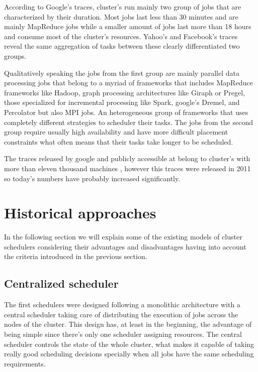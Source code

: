 \documentclass{report}                     %
\begin{document}
According to Google's traces, cluster's run mainly two group of jobs that
are characterized by their duration. Most jobs last less than 30 minutes
and are mainly MapReduce jobs while a smaller amount of jobs last
more than 18 hours and consume most of the cluster's resources. Yahoo's
and Facebook's traces reveal the same aggregation of tasks between these
clearly differentiated two groups.

Qualitatively speaking the jobs from the first group are mainly parallel
data processing jobs that belong to a myriad of frameworks that includes
MapReduce frameworks like Hadoop, graph processing architectures like
Giraph or Pregel, those specialized for incremental processing like Spark, 
google's Dremel, and Percolator but also MPI jobs. An heterogeneous group
of frameworks that uses completely different strategies to scheduler their
tasks. The jobs from the second group require usually high availability and
have more difficult placement constraints what often means that their tasks
take longer to be scheduled.

The traces released by google and publicly accessible at
\cite{_googleclusterdata_????} belong to cluster's with more than
eleven thousand machines , however this traces were released in 2011
so today's numbers have probably increased significantly.


\chapter{Historical approaches}
\label{sec:approaches}


In the following section we will explain some of the existing models
of cluster schedulers considering their advantages and disadvantages
having into account the criteria introduced in the previous
section. 

\section{Centralized scheduler}

The first schedulers were designed following a monolithic architecture
with a central scheduler taking care of distributing the execution
of jobs across the nodes of the cluster. This design has, at least in
the beginning, the advantage of being simple since there's only one
scheduler assigning resources. The central scheduler controls the
state of the whole cluster, what makes it capable of taking really
good scheduling decisions specially when all jobs have the same
scheduling requirements. 
\end{document}
